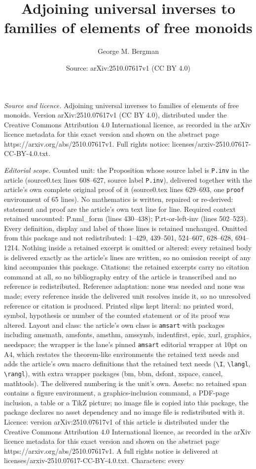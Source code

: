 \documentclass[10pt,a4paper]{amsart}
\title[Adjoining universal inverses to families of elements of free]{Adjoining universal inverses to families of elements of free monoids}
\author{George M. Bergman}
\date{Source: arXiv:2510.07617v1 (CC BY 4.0)}
\begin{document}
\maketitle

\noindent\emph{Source and licence.} Adjoining universal inverses to families of elements of free monoids. Version arXiv:2510.07617v1 (CC BY 4.0), distributed under the Creative Commons Attribution 4.0 International licence, as recorded in the arXiv licence metadata for this exact version and shown on the abstract page https://arxiv.org/abs/2510.07617v1. Full rights notice: licenses/arxiv-2510.07617-CC-BY-4.0.txt.\par\smallskip

\noindent\textit{Editorial scope.} Counted unit: the Proposition whose source label is \texttt{P.inv} in the article (source0.tex lines 608--627, source label \texttt{P.inv}), delivered together with the article's own complete original proof of it (source0.tex lines 629--693, one \texttt{proof} environment of 65 lines). No mathematics is written, repaired or re-derived: statement and proof are the article's own text line for line. Required context retained uncounted: P.nml\_form (lines 430--438); P.rt-or-left-inv (lines 502--523). Every definition, display and label of those lines is retained unchanged. Omitted from this package and not redistributed: 1--429, 439--501, 524--607, 628--628, 694--1214. Nothing inside a retained excerpt is omitted or altered: every retained body is delivered exactly as the article's lines are written, so no omission receipt of any kind accompanies this package. Citations: the retained excerpts carry no citation command at all, so no bibliography entry of the article is transcribed and no reference is redistributed. Reference adaptation: none was needed and none was made; every reference inside the delivered unit resolves inside it, so no unresolved reference or citation is produced. Printed slips kept literal: no printed word, symbol, hypothesis or number of the counted statement or of its proof was altered. Layout and class: the article's own class is \texttt{amsart} with packages including amsmath, amsfonts, amsthm, amssymb, indentfirst, epic, xurl, graphics, needspace; the wrapper is the lane's pinned \texttt{amsart} editorial wrapper at 10pt on A4, which restates the theorem-like environments the retained text needs and adds the article's own macro definitions that the retained text needs (\texttt{\textbackslash I}, \texttt{\textbackslash langl}, \texttt{\textbackslash rangl}), with extra wrapper packages (bm, bbm, dsfont, xspace, cancel, mathtools). The delivered numbering is the unit's own. Assets: no retained span contains a figure environment, a graphics-inclusion command, a PDF-page inclusion, a table or a TikZ picture; no image file is copied into this package, the package declares no asset dependency and no image file is redistributed with it. Licence: version arXiv:2510.07617v1 of this article is distributed under the Creative Commons Attribution 4.0 International licence, as recorded in the arXiv licence metadata for this exact version and shown on the abstract page https://arxiv.org/abs/2510.07617v1. A full rights notice is delivered at licenses/arxiv-2510.07617-CC-BY-4.0.txt. Characters: every 
\end{document}

